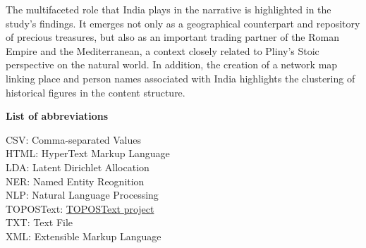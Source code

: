 The multifaceted role that India plays in the narrative is highlighted in the study's findings. It emerges not only as a geographical counterpart and repository of precious treasures, but also as an important trading partner of the Roman Empire and the Mediterranean, a context closely related to Pliny's Stoic perspective on the natural world. In addition, the creation of a network map linking place and person names associated with India highlights the clustering of historical figures in the content structure.

\newpage


\raggedright

\Large\textbf{List of abbreviations}   

\vspace*{\baselineskip}
\normalsize
{}
CSV: Comma-separated Values\\
HTML: HyperText Markup Language\\
LDA: Latent Dirichlet Allocation\\
NER: Named Entity Reognition\\
NLP: Natural Language Processing \\
TOPOSText: \href{https://topostext.org/}{TOPOSText project} \\
TXT: Text File\\
XML: Extensible Markup Language\\

\newpage

\normalsize
\justifying